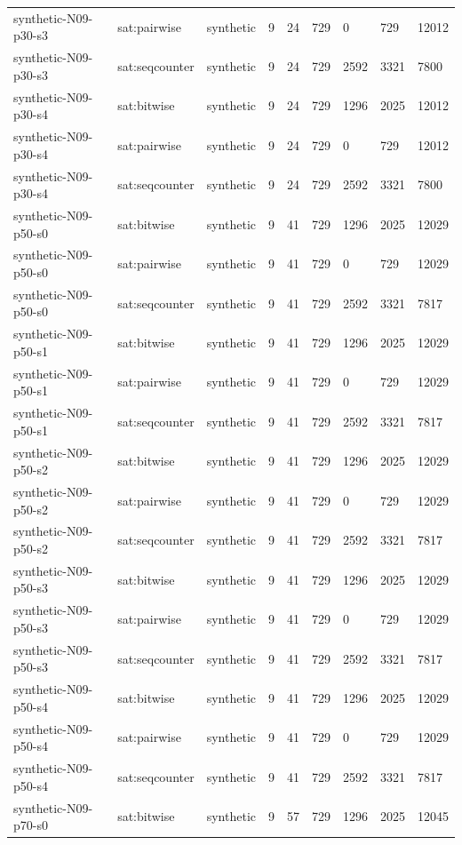 \begin{tabular}{lllllllll}
synthetic-N09-p30-s3 & sat:pairwise & synthetic & 9 & 24 & 729 & 0 & 729 & 12012 \\
synthetic-N09-p30-s3 & sat:seqcounter & synthetic & 9 & 24 & 729 & 2592 & 3321 & 7800 \\
synthetic-N09-p30-s4 & sat:bitwise & synthetic & 9 & 24 & 729 & 1296 & 2025 & 12012 \\
synthetic-N09-p30-s4 & sat:pairwise & synthetic & 9 & 24 & 729 & 0 & 729 & 12012 \\
synthetic-N09-p30-s4 & sat:seqcounter & synthetic & 9 & 24 & 729 & 2592 & 3321 & 7800 \\
synthetic-N09-p50-s0 & sat:bitwise & synthetic & 9 & 41 & 729 & 1296 & 2025 & 12029 \\
synthetic-N09-p50-s0 & sat:pairwise & synthetic & 9 & 41 & 729 & 0 & 729 & 12029 \\
synthetic-N09-p50-s0 & sat:seqcounter & synthetic & 9 & 41 & 729 & 2592 & 3321 & 7817 \\
synthetic-N09-p50-s1 & sat:bitwise & synthetic & 9 & 41 & 729 & 1296 & 2025 & 12029 \\
synthetic-N09-p50-s1 & sat:pairwise & synthetic & 9 & 41 & 729 & 0 & 729 & 12029 \\
synthetic-N09-p50-s1 & sat:seqcounter & synthetic & 9 & 41 & 729 & 2592 & 3321 & 7817 \\
synthetic-N09-p50-s2 & sat:bitwise & synthetic & 9 & 41 & 729 & 1296 & 2025 & 12029 \\
synthetic-N09-p50-s2 & sat:pairwise & synthetic & 9 & 41 & 729 & 0 & 729 & 12029 \\
synthetic-N09-p50-s2 & sat:seqcounter & synthetic & 9 & 41 & 729 & 2592 & 3321 & 7817 \\
synthetic-N09-p50-s3 & sat:bitwise & synthetic & 9 & 41 & 729 & 1296 & 2025 & 12029 \\
synthetic-N09-p50-s3 & sat:pairwise & synthetic & 9 & 41 & 729 & 0 & 729 & 12029 \\
synthetic-N09-p50-s3 & sat:seqcounter & synthetic & 9 & 41 & 729 & 2592 & 3321 & 7817 \\
synthetic-N09-p50-s4 & sat:bitwise & synthetic & 9 & 41 & 729 & 1296 & 2025 & 12029 \\
synthetic-N09-p50-s4 & sat:pairwise & synthetic & 9 & 41 & 729 & 0 & 729 & 12029 \\
synthetic-N09-p50-s4 & sat:seqcounter & synthetic & 9 & 41 & 729 & 2592 & 3321 & 7817 \\
synthetic-N09-p70-s0 & sat:bitwise & synthetic & 9 & 57 & 729 & 1296 & 2025 & 12045 \\

\end{tabular}
